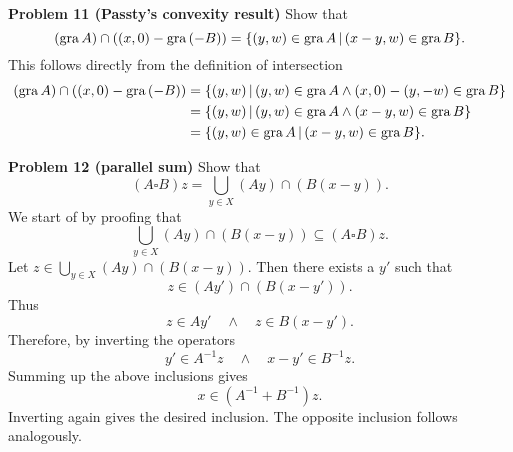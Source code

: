 \documentclass{scrartcl}
\newcommand{\sub}{\subseteq}
\theoremstyle{plain}
\theoremstyle{remark}
\newcommand{\gr}{\textup{gra}\,}
\begin{document}
\textbf{Problem 11 (Passty's convexity result)} Show that
\begin{equation}
  (\gr A) \cap ((x,0) - \gr (-B)) = \{(y,w) \in \gr A \,| \,(x-y,w) \in \gr B\}.
\end{equation}
This follows directly from the definition of intersection
\begin{equation}
  \begin{aligned}
    (\gr A) \cap ((x,0) - \gr (-B)) &= \{(y,w) \,| \,(y,w) \in \gr A \wedge (x,0) - (y,-w) \in \gr B\} \\
    &= \{(y,w) \,| \,(y,w) \in \gr A \wedge (x-y,w) \in \gr B\} \\
    &= \{(y,w) \in \gr A \,| \,(x-y,w) \in \gr B\}.
  \end{aligned}
\end{equation}

\textbf{Problem 12 (parallel sum)} Show that
\begin{equation}
  (A \square B)z = \bigcup_{y \in X} (Ay) \cap (B(x-y)).
\end{equation}
We start of by proofing that
\begin{equation}
  \bigcup_{y \in X} (Ay) \cap (B(x-y)) \sub (A \square B)z.
\end{equation}
Let $z \in \bigcup_{y \in X} (Ay) \cap (B(x-y))$.
Then there exists a $y'$ such that
\begin{equation}
  z \in (Ay') \cap (B(x-y')).
\end{equation}
Thus 
\begin{equation}
  z \in A y' \quad \wedge \quad z \in B(x-y').
\end{equation}
Therefore, by inverting the operators
\begin{equation}
  y' \in A^{-1} z \quad \wedge \quad x - y' \in B^{-1}z.
\end{equation}
Summing up the above inclusions gives
\begin{equation}
  x \in (A^{-1} + B^{-1})z.
\end{equation}
Inverting again gives the desired inclusion. The opposite inclusion follows analogously.
\end{document}
